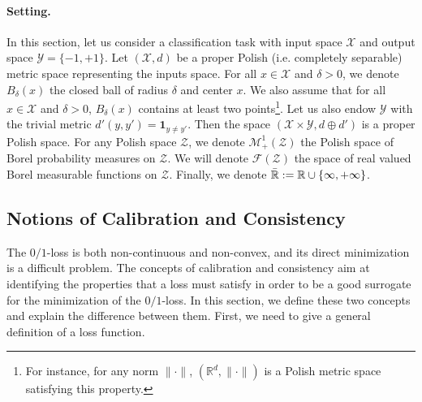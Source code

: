 
\paragraph{Setting.} In this section, let us consider a classification task with input space $\mathcal{X}$ and output space $\mathcal{Y}=\{-1,+1\}$. Let $(\mathcal{X},d)$ be a proper Polish (i.e. completely separable) metric space representing the inputs space. For all $x\in\mathcal{X}$ and $\delta>0$, we denote $B_\delta(x)$ the closed ball of radius $\delta$ and center $x$. We also assume that for all $x\in\mathcal{X}$ and $\delta>0$,  $B_\delta(x)$ contains at least two points\footnote{For instance, for any norm $\lVert\cdot\rVert$,  $(\mathbb{R}^d,\lVert \cdot \rVert)$ is a Polish metric space satisfying this property.}. Let us also endow $\mathcal{Y}$ with the trivial metric  $d'(y,y') = \mathbf{1}_{y\neq y'}$. Then the space $(\mathcal{X}\times\mathcal{Y},d\oplus d')$ is a proper Polish space. For any Polish space $\mathcal{Z}$, we denote $\mathcal{M}_+^1(\mathcal{Z})$ the Polish space of Borel probability measures on $\mathcal{Z}$. We will denote $\mathcal{F}(\mathcal{Z})$ the space of real valued Borel measurable functions on $\mathcal{Z}$. Finally, we denote $\bar{\mathbb{R}}:=\mathbb{R}\cup\{\-\infty,+\infty\}$.


\subsection{Notions of Calibration and Consistency}

The $0/1$-loss is both non-continuous and non-convex, and its direct minimization is a difficult problem. The concepts of calibration and consistency aim at identifying the properties that a loss must satisfy in order to be a good surrogate for the minimization of the $0/1$-loss. In this section, we define these two concepts and explain the difference between them. First, we need to give a general definition of a loss function.

